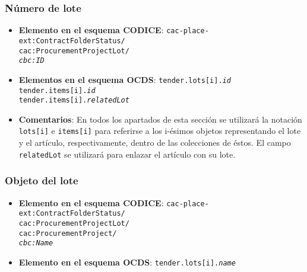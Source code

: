         \subsubsection{Número de lote}
            \begin{itemize}
                \item \textbf{Elemento en el esquema CODICE}:
                    \tabto{7.6cm} \texttt{cac-place-ext:ContractFolderStatus/} \\
                    \tabto{7.6cm} \texttt{cac:ProcurementProjectLot/} \\
                    \tabto{7.6cm} \texttt{\textit{cbc:ID}}
                \item \textbf{Elementos en el esquema OCDS}:
                    \tabto{7.6cm} \texttt{tender.lots[i].\textit{id}} \\
                    \tabto{7.6cm} \texttt{tender.items[i].\textit{id}} \\
                    \tabto{7.6cm} \texttt{tender.items[i].\textit{relatedLot}} \\
                \item \textbf{Comentarios}: En todos los apartados de esta sección se utilizará la notación \texttt{lots[i]} e \texttt{items[i]} para referirse a los i-ésimos objetos representando el lote y el artículo, respectivamente, dentro de las colecciones de éstos. El campo \texttt{relatedLot} se utilizará para enlazar el artículo con su lote.
            \end{itemize}
            
        \subsubsection{Objeto del lote}
            \begin{itemize}
                \item \textbf{Elemento en el esquema CODICE}:
                    \tabto{7.6cm} \texttt{cac-place-ext:ContractFolderStatus/} \\
                    \tabto{7.6cm} \texttt{cac:ProcurementProjectLot/} \\
                    \tabto{7.6cm} \texttt{cac:ProcurementProject/} \\
                    \tabto{7.6cm} \texttt{\textit{cbc:Name}}
                \item \textbf{Elemento en el esquema OCDS}:
                    \tabto{7.6cm} \texttt{tender.lots[i].\textit{name}}
            \end{itemize}
        
